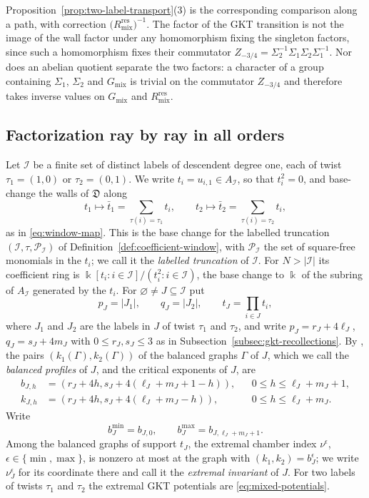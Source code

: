 Proposition~\ref{prop:two-label-transport}(3) is the corresponding
comparison along a path, with correction $\bigl(R^{\mathrm{res}}_{\mathrm{mix}}\bigr)^{-1}$.  The
factor of the GKT transition is not the image of the wall factor under any
homomorphism fixing the singleton factors, since such a homomorphism fixes their commutator
$Z_{-3/4}=\Sigma_2^{-1}\Sigma_1\Sigma_2\Sigma_1^{-1}$.  Nor does an abelian
quotient separate the two factors: a character of a group containing
$\Sigma_1$, $\Sigma_2$ and $G_{\mathrm{mix}}$ is trivial on the commutator
$Z_{-3/4}$ and therefore takes inverse values on $G_{\mathrm{mix}}$ and $R^{\mathrm{res}}_{\mathrm{mix}}$.

\subsection{Factorization ray by ray in all orders}
\label{subsec:raywise-factorization}

Let $\mathcal I$ be a finite set of distinct labels of descendent degree
one, each of twist $\tau_1=(1,0)$ or $\tau_2=(0,1)$.  We write
$t_i=u_{i,1}\in A_{\mathcal I}$, so that $t_i^2=0$, and base-change the walls
of $\mathfrak D$ along
\[
 t_1\longmapsto\bar t_1=\sum_{\tau(i)=\tau_1}t_i,
 \qquad t_2\longmapsto\bar t_2=\sum_{\tau(i)=\tau_2}t_i,
\]
as in \eqref{eq:window-map}.  This is the base change for the labelled
truncation $(\mathcal I,\tau,\mathscr P_{\mathcal I})$ of
Definition~\ref{def:coefficient-window}, with $\mathscr P_{\mathcal I}$ the
set of square-free monomials
in the $t_i$; we call it the \emph{labelled truncation} of $\mathcal I$.  For
$N>|\mathcal I|$ its coefficient ring is
$\Bbbk[t_i:i\in\mathcal I]/(t_i^2:i\in\mathcal I)$, the base change to
$\Bbbk$ of the subring of $A_{\mathcal I}$ generated by the $t_i$.  For
$\varnothing\ne J\subseteq\mathcal I$ put
\[
 p_J=|J_1|,
 \qquad q_J=|J_2|,
 \qquad t_J=\prod_{i\in J}t_i,
\]
where $J_1$ and $J_2$ are the labels in $J$ of twist $\tau_1$ and $\tau_2$,
and write $p_J=r_J+4\ell_J$, $q_J=s_J+4m_J$ with $0\leq
r_J,s_J\leq3$ as in Subsection~\ref{subsec:gkt-recollections}.  By
\cite[Notation~2.40 and (2.30)--(2.31)]{grossetal2022open}, the pairs
$(k_1(\Gamma),k_2(\Gamma))$ of the balanced graphs $\Gamma$ of $J$, which we
call the \emph{balanced profiles} of $J$, and the critical exponents of $J$,
are
\begin{align}
 b_{J,h}
 &=(r_J+4h,s_J+4(\ell_J+m_J+1-h)),
 &&0\leq h\leq\ell_J+m_J+1,\label{eq:balanced-profiles}\\
 k_{J,h}
 &=(r_J+4h,s_J+4(\ell_J+m_J-h)),
 &&0\leq h\leq\ell_J+m_J.\label{eq:critical-profiles}
\end{align}
Write
\[
 b_J^{\min}=b_{J,0},
 \qquad
 b_J^{\max}=b_{J,\ell_J+m_J+1}.
\]
Among the balanced graphs of support $t_J$, the extremal chamber index
$\nu^\epsilon$, $\epsilon\in\{\min,\max\}$, is nonzero at most at the graph
with $(k_1,k_2)=b_J^\epsilon$; we write $\nu_J^\epsilon$ for its coordinate there and call it
the \emph{extremal invariant} of $J$.  For two labels of twists $\tau_1$ and
$\tau_2$ the extremal GKT potentials are \eqref{eq:mixed-potentials}.

